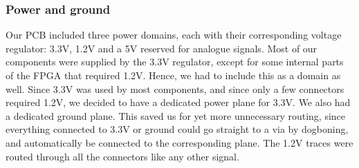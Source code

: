\subsubsection{Power and ground}
Our PCB included three power domains, each with their corresponding voltage regulator: 3.3V, 1.2V and a 5V reserved for analogue signals. Most of our components were supplied by the 3.3V regulator, except for some internal parts of the FPGA that required 1.2V. Hence, we had to include this as a domain as well. 
\newline
\newline
Since 3.3V was used by most components, and since only a few connectors required 1.2V, we decided to have a dedicated power plane for 3.3V. We also had a dedicated ground plane. This saved us for yet more unnecessary routing, since everything connected to 3.3V or ground could go straight to a via by dogboning, and automatically be connected to the corresponding plane. The 1.2V traces were routed through all the connectors like any other signal. 

